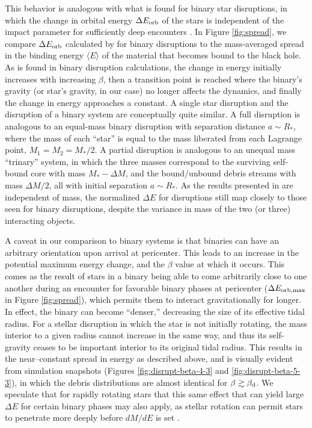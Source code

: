 \documentclass[twocolumn]{emulateapj}
\newcommand{\dmde}{dM/dE}
\begin{document}
This behavior is analogous with what is found for binary star disruptions, in which the change in orbital energy $\Delta E_{\rm orb}$ of the stars is independent of the impact parameter for sufficiently deep encounters \citep{Sari:2010de}. In Figure \ref{fig:spread}, we compare $\Delta E_{\rm orb}$ calculated by \citeauthor{Sari:2010de} for binary disruptions to the mass-averaged spread in the binding energy $\langle E\rangle$ of the material that becomes bound to the black hole. As is found in binary disruption calculations, the change in energy initially increases with increasing $\beta$, then a transition point is reached where the binary's gravity (or star's gravity, in our case) no longer affects the dynamics, and finally the change in energy approaches a constant. A single star disruption and the disruption of a binary system are conceptually quite similar. A full disruption is analogous to an equal-mass binary disruption with separation distance $a \sim R_{\ast}$, where the mass of each ``star'' is equal to the mass liberated from each Lagrange point, $M_{1} = M_{2} = M_{\ast} / 2$. A partial disruption is analogous to an unequal mass ``trinary'' system, in which the three masses correspond to the surviving self-bound core with mass $M_{\ast} - \Delta M$, and the bound/unbound debris streams with mass $\Delta M/2$, all with initial separation $a \sim R_{\ast}$. As the results presented in \citeauthor{Sari:2010de} are independent of mass, the normalized $\Delta E$ for disruptions still map closely to those seen for binary disruptions, despite the variance in mass of the two (or three) interacting objects.

A caveat in our comparison to binary systems is that binaries can have an arbitrary orientation upon arrival at pericenter. This leads to an increase in the potential maximum energy change, and the $\beta$ value at which it occurs. This comes as the result of stars in a binary being able to come arbitrarily close to one another during an encounter for favorable binary phases at pericenter ($\Delta E_{\rm orb,\max}$ in Figure \ref{fig:spread}), which permits them to interact gravitationally for longer. In effect, the binary can become ``denser,'' decreasing the size of its effective tidal radius. For a stellar disruption in which the star is not initially rotating, the mass interior to a given radius cannot increase in the same way, and thus its self-gravity ceases to be important interior to its original tidal radius. This results in the near--constant spread in energy as described above, and is visually evident from simulation snapshots (Figures \ref{fig:disrupt-beta-4-3} and \ref{fig:disrupt-beta-5-3}), in which the debris distributions are almost identical for $\beta \gtrsim \beta_{\rm d}$. We speculate that for rapidly rotating stars that this same effect that can yield large $\Delta E$ for certain binary phases may also apply, as stellar rotation can permit stars to penetrate more deeply before $\dmde$ is set \citep{Stone:2012ul}.
\end{document}
